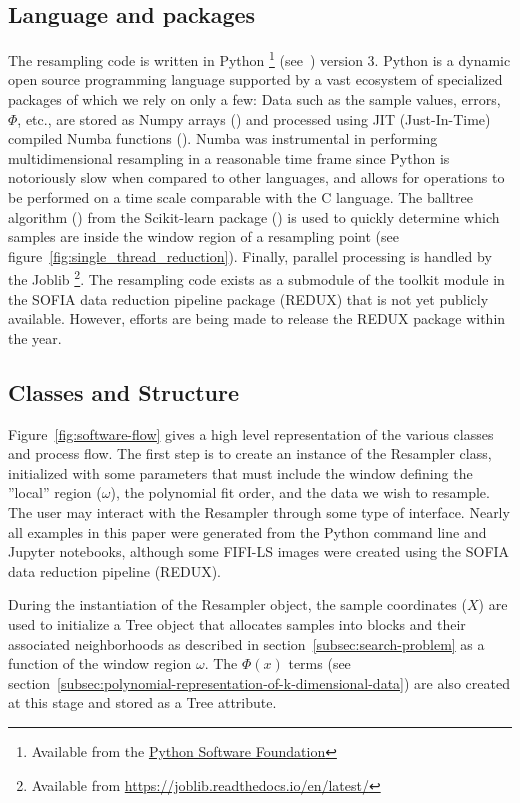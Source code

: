 \subsection{Language and packages}
\label{subsec:packages}

The resampling code is written in Python \footnote{Available from the
\href{http://www.python.org}{Python Software Foundation}}
(see~\citet{Python1995}) version 3.
Python is a dynamic open source programming language supported by a vast
ecosystem of specialized packages of which we rely on only a few:
Data such as the sample values, errors, $\Phi$, etc., are stored as Numpy arrays
(\citet{Numpy}) and processed using JIT (Just-In-Time) compiled Numba
functions (\citet{Numba}).
Numba was instrumental in performing multidimensional resampling in a
reasonable time frame since Python is notoriously slow when compared to
other languages, and allows for operations to be performed on a time scale
comparable with the C language.
The balltree algorithm (\citet{Balltree}) from the Scikit-learn package
(\citet{sklearn}) is used to quickly determine which samples are inside the
window region of a resampling point (see
figure~\ref{fig:single_thread_reduction}).
Finally, parallel processing is handled by the Joblib
\footnote{Available from \href{https://joblib.readthedocs.io/en/latest/}
{https://joblib.readthedocs.io/en/latest/}}.
The resampling code exists as a submodule of the toolkit module in the SOFIA
data reduction pipeline package (REDUX) that is not yet publicly available.
However, efforts are being made to release the REDUX package within the year.

\subsection{Classes and Structure}
\label{subsec:class-structure}

Figure~\ref{fig:software-flow} gives a high level representation of the
various classes and process flow.
The first step is to create an instance of the Resampler class, initialized
with some parameters that must include the window defining the
''local'' region ($\omega$), the polynomial fit order, and the data we wish to
resample.
The user may interact with the Resampler through some type of interface.
Nearly all examples in this paper were generated from the Python command line
and Jupyter notebooks, although some FIFI-LS images were created using the
SOFIA data reduction pipeline (REDUX).

During the instantiation of the Resampler object, the sample coordinates ($X$)
are used to initialize a Tree object that allocates samples into blocks and
their associated neighborhoods as described in
section~\ref{subsec:search-problem} as a function of the window region $\omega$.
The $\Phi(x)$ terms (see
section~\ref{subsec:polynomial-representation-of-k-dimensional-data}) are also
created at this stage and stored as a Tree attribute.

